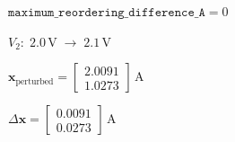 \documentclass[border=12pt]{standalone}
\begin{document}
\color{weeknavy}
\parbox{14cm}{\centering $\displaystyle \texttt{maximum\_reordering\_difference\_A}=0$}
\vspace{4pt}
\parbox{14cm}{\centering $\displaystyle V_{2}:\;2.0\,\mathrm V\;\longrightarrow\;2.1\,\mathrm V$}
\vspace{4pt}
\parbox{14cm}{\centering $\displaystyle \mathbf{x}_{\mathrm{perturbed}}=\begin{bmatrix}2.0091\\1.0273\end{bmatrix}\,\mathrm A$}
\vspace{4pt}
\parbox{14cm}{\centering $\displaystyle \Delta\mathbf{x}=\begin{bmatrix}0.0091\\0.0273\end{bmatrix}\,\mathrm A$}
\end{document}
